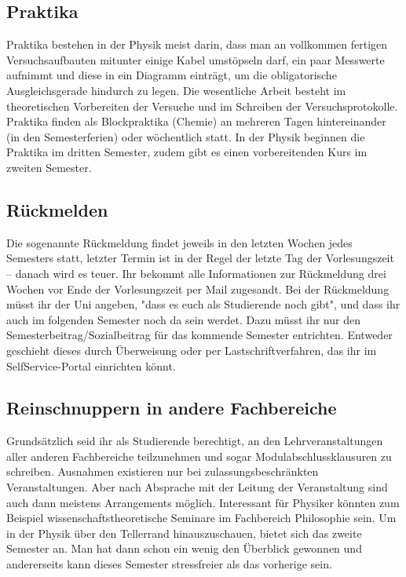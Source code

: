 \begin{multicols}{2}
\subsection{Praktika}
Praktika bestehen in der Physik meist darin, dass man an vollkommen fertigen Versuchsaufbauten mitunter einige Kabel umstöpseln darf, ein paar Messwerte aufnimmt und diese in ein Diagramm einträgt, um die obligatorische Ausgleichsgerade hindurch zu legen.
Die wesentliche Arbeit besteht im theoretischen Vorbereiten der Versuche und im Schreiben der Versuchsprotokolle.
Praktika finden als Blockpraktika (Chemie) an mehreren Tagen hintereinander (in den Semesterferien) oder wöchentlich statt.
In der Physik beginnen die Praktika im dritten Semester, zudem gibt es einen vorbereitenden Kurs im zweiten Semester.

\subsection{Rückmelden}
Die sogenannte Rückmeldung findet jeweils in den letzten Wochen jedes Semesters statt, letzter Termin ist in der Regel der letzte Tag der Vorlesungszeit -- danach wird es teuer.
Ihr bekommt alle Informationen zur Rückmeldung drei Wochen vor Ende der Vorlesungszeit per Mail zugesandt.
Bei der Rückmeldung müsst ihr der Uni angeben, "dass es euch als Studierende noch gibt", und dass ihr auch im folgenden Semester noch da sein werdet.
Dazu müsst ihr nur den Semesterbeitrag/Sozialbeitrag für das kommende Semester entrichten.
Entweder geschieht dieses durch Überweisung oder per Lastschriftverfahren, das ihr im SelfService-Portal einrichten könnt.

\subsection{Reinschnuppern in andere Fachbereiche}
Grundsätzlich seid ihr als Studierende berechtigt, an den Lehrveranstaltungen aller anderen Fachbereiche teilzunehmen und sogar Modulabschlussklausuren zu schreiben.
Ausnahmen existieren nur bei zulassungsbeschränkten Veranstaltungen.
Aber nach Absprache mit der Leitung der Veranstaltung sind auch dann meistens Arrangements möglich.
Interessant für Physiker könnten zum Beispiel wissenschaftstheoretische Seminare im Fachbereich Philosophie sein.
Um in der Physik über den Tellerrand hinauszuschauen, bietet sich das zweite Semester an.
Man hat dann schon ein wenig den Überblick gewonnen und andererseits kann dieses Semester stressfreier als das vorherige sein.

\end{multicols}
